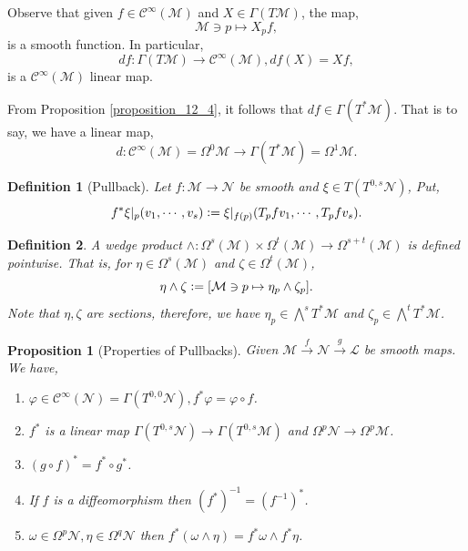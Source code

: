 \documentclass[8pt]{article}
\newtheorem{proposition}{Proposition}[section]
\newtheorem{definition}{Definition}[section]
\newcommand{\defeq}{\vcentcolon=}
\newcommand{\M}[0]{\mathcal{M}}
\newcommand{\maniN}[0]{\mathcal{N}}
\newcommand{\cinf}[0]{\mathcal{C}^\infty}
\begin{document}
Observe that given $f\in\cinf(\M)$ and $X\in\Gamma(T\M)$, the map,
\begin{equation*}
  \M\ni p\mapsto X_pf,
\end{equation*}
is a smooth function. In particular,
\begin{equation*}
  df:\Gamma(T\M)\to\cinf(\M), df(X)=Xf,
\end{equation*}
is a $\cinf(\M)$ linear map. 
\par From Proposition \ref{proposition_12_4}, it follows that $df\in\Gamma(T^*\M)$. That is to say, we have a linear map,
\begin{equation*}
  d:\cinf(\M)=\Omega^0\M\to\Gamma(T^*\M)=\Omega^1\M.
\end{equation*}
\begin{definition}[Pullback]
  \label{defnition_12_5}
  Let $f:\M\to\maniN$ be smooth and $\xi\in T(T^{0,s}\maniN)$, Put,
  \begin{equation*}
    f^*\xi|_p(v_1,\cdots,v_s) \defeq \xi|_{f(p)}(T_pfv_1,\cdots,T_pfv_s).
  \end{equation*}
\end{definition}

\begin{definition}
  A wedge product $\wedge:\Omega^s(\M)\times\Omega^t(\M)\to\Omega^{s+t}(\M)$ is defined pointwise. That is,
  for $\eta\in\Omega^s(\M)$ and $\zeta\in\Omega^t(\M)$, 
  \begin{equation*}
    \eta\wedge \zeta\defeq [\M\ni p\mapsto \eta_p\wedge\zeta_p].
  \end{equation*}
  Note that $\eta,\zeta$ are sections, therefore, we have $\eta_p\in\bigwedge^sT^*\M$ and $\zeta_p\in\bigwedge^tT^*\M$.
\end{definition}
\begin{proposition}[Properties of Pullbacks]
  \label{proposition_12_6}
  Given $\M\stackrel{f}{\to}\maniN\stackrel{g}{\to}\mathcal{L}$ be smooth maps. We have,
  \begin{enumerate}
    \item $\varphi\in\cinf(\maniN)=\Gamma(T^{0,0}\maniN), f^*\varphi=\varphi\circ f$.
    \item $f^*$ is a linear map $\Gamma(T^{0,s}\maniN)\to\Gamma(T^{0,s}\M)$ and $\Omega^p\maniN\to\Omega^p\M$. 
    \item $(g\circ f)^* = f^*\circ g^*$.
    \item If $f$ is a diffeomorphism then $(f^*)^{-1} = (f^{-1})^*$.
    \item $\omega\in\Omega^p\maniN,\eta\in\Omega^q\maniN$ then $f^*(\omega\wedge\eta) = f^*\omega\wedge f^*\eta$.
  \end{enumerate}
\end{proposition}
\end{document}
